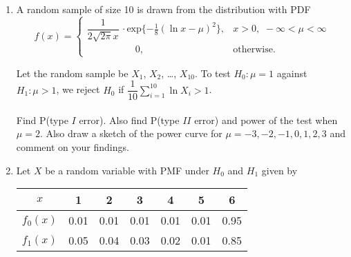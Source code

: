 \documentclass[11pt, a4paper]{article}
\begin{document}
\begin{enumerate}
	
	
	
	
	\item A random sample of size 10 is drawn from the distribution with PDF
	\begin{equation*}
	 f(x) =
		\begin{cases}
		 \dfrac{1}{2\sqrt{2\pi}x} \, \cdot \text{exp}\{-\frac{1}{8}(\ln x - \mu )^2\}, & x > 0, \,\, -\infty < \mu < \infty  \\
		 \hspace{60pt} 0, & \text{otherwise}.
		\end{cases}
	\end{equation*}
	
	Let the random sample be $X_1$, $X_2$, \ldots, $X_{10}$. To test $H_0 : \mu = 1$ against $H_1 : \mu > 1$, we reject $H_0$ if $\dfrac{1}{10} \sum\limits_{i = 1}^{10} \ln X_i > 1$. \\ \\
	Find P(type $I$ error). Also find P(type $II$ error) and power of the test when $\mu = 2$. Also draw a sketch of the power curve for $\mu = -3, -2, -1, 0, 1, 2, 3$ and comment on your findings.
	
	
	
	
	
	
	


	\item Let $X$ be a random variable with PMF under $H_0$ and $H_1$ given by
	
	\begin{table}[!htbp]
	\def\arraystretch{1.5}
	
	\begin{center}
	\begin{tabular}{|c||cccccc|}
	
	\hline
	
	$x$ & 1 & 2 & 3 & 4 & 5 & 6 \\
	
	\hline
	
	$f_0(x)$ & 0.01 & 0.01 & 0.01 & 0.01 & 0.01 & 0.95 \\
	
	\hline
	
	$f_1(x)$ & 0.05 & 0.04 & 0.03 & 0.02 & 0.01 & 0.85 \\
	
	\hline
	
	\end{tabular}
	\end{center}
	
	\end{table}
	

\end{enumerate}
\end{document}
